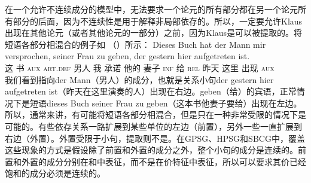 在一个允许不连续成分的模型中，无法要求一个论元的所有部分都在另一个论元所有部分的后面，因为不连续性是用于解释非局部依存的。所以，一定要允许Klaus出现在其他论元（或者其他论元的一部分）之前，因为Klaus是可以被提取的。将短语各部分相混合的例子如 （）所示：
\ea
\gll Dieses Buch hat der Mann mir versprochen, seiner Frau zu geben, der gestern hier aufgetreten ist.\\
     这   书 \textsc{aux} \textsc{art}.\textsc{def} 男人  我  承诺     他的    妻子 \textsc{inf} 给   \textsc{rel} 昨天 这里 出现 \textsc{aux}\\
\z 
我们看到指向der Mann（男人）的成分，也就是关系小句der gestern hier aufgetreten ist（昨天在这里演奏的人）出现在右边。geben（给）的宾语，正常情况下是短语dieses Buch seiner Frau zu geben（这本书他妻子要给）出现在左边。所以，通常来讲，有可能将短语各部分相混合，但是只在一种非常受限的情况下是可能的。有些依存关系一路扩展到某些单位的左边（前置），另外一些一直扩展到右边（外置）。外置受限于小句，提取则不是。在GPSG、HPSG和SBCG中，覆盖这些现象的方式是假设除了前置和外置的成分之外，整个小句的成分是连续的。前置和外置的成分分别在\slaschc 和\extrac\citep{Keller95b,Mueller99a}中表征，而不是在价特征中表征，所以可以要求其价已经饱和的成分必须是连续的。

